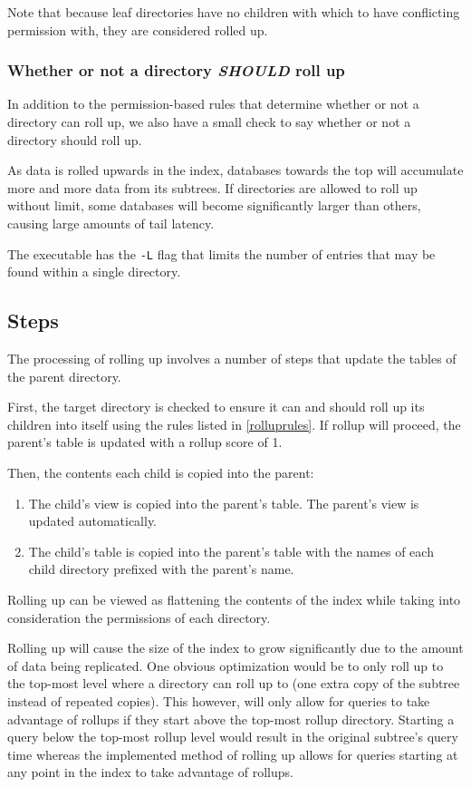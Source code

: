Note that because leaf directories have no children with which to have
conflicting permission with, they are considered rolled up.

\subsubsection{Whether or not a directory {\it SHOULD} roll up}
In addition to the permission-based rules that determine whether or
not a directory can roll up, we also have a small check to say whether
or not a directory should roll up.

As data is rolled upwards in the index, databases towards the top will
accumulate more and more data from its subtrees. If directories are
allowed to roll up without limit, some databases will become
significantly larger than others, causing large amounts of tail
latency.

The \rollup executable has the \texttt{-L} flag that limits the number
of entries that may be found within a single directory.

\subsection{Steps}
The processing of rolling up involves a number of steps that update
the tables of the parent directory.

First, the target directory is checked to ensure it can and should
roll up its children into itself using the rules listed in
\ref{rolluprules}. If rollup will proceed, the parent's \summary table
is updated with a rollup score of 1.

Then, the contents each child is copied into the parent:

\begin{enumerate}
\item The child's \pentries view is copied into the parent's
  \pentriesrollup table. The parent's \pentries view is updated
  automatically.
\item The child's \summary table is copied into the parent's \summary
  table with the names of each child directory prefixed with the parent's
  name.
\end{enumerate}

Rolling up can be viewed as flattening the contents of the index while
taking into consideration the permissions of each directory.

Rolling up will cause the size of the index to grow significantly due
to the amount of data being replicated. One obvious optimization would
be to only roll up to the top-most level where a directory can roll up
to (one extra copy of the subtree instead of repeated copies). This
however, will only allow for queries to take advantage of rollups if
they start above the top-most rollup directory. Starting a query below
the top-most rollup level would result in the original subtree's query
time whereas the implemented method of rolling up allows for queries
starting at any point in the index to take advantage of rollups.

